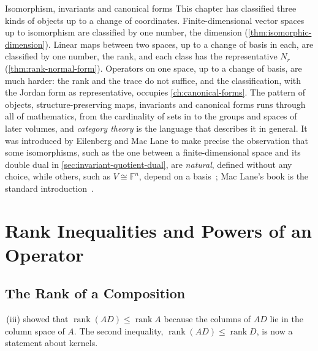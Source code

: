 \begin{note}{Isomorphism, invariants and canonical forms}
This chapter has classified three kinds of objects up to a change of coordinates. Finite-dimensional vector spaces up to isomorphism are classified by one number, the dimension (\cref{thm:isomorphic-dimension}). Linear maps between two spaces, up to a change of basis in each, are classified by one number, the rank, and each class has the representative $N_r$ (\cref{thm:rank-normal-form}). Operators on one space, up to a change of basis, are much harder: the rank and the trace do not suffice, and the classification, with the Jordan form as representative, occupies \cref{ch:canonical-forms}. The pattern of objects, structure-preserving maps, invariants and canonical forms runs through all of mathematics, from the cardinality of sets in  to the groups and spaces of later volumes, and \emph{category theory} is the language that describes it in general. It was introduced by Eilenberg and Mac Lane to make precise the observation that some isomorphisms, such as the one between a finite-dimensional space and its double dual in \cref{sec:invariant-quotient-dual}, are \emph{natural}, defined without any choice, while others, such as $V\cong\mathbb F^n$, depend on a basis~\cite{eilenberg1945}; Mac Lane's book is the standard introduction~\cite{maclane1998}.
\end{note}

\section{Rank Inequalities and Powers of an Operator}
\label{sec:rank-inequalities}

\subsection{The Rank of a Composition}

\,(iii) showed that $\operatorname{rank}(AD)\le\operatorname{rank}A$ because the columns of $AD$ lie in the column space of $A$. The second inequality, $\operatorname{rank}(AD)\le\operatorname{rank}D$, is now a statement about kernels.

